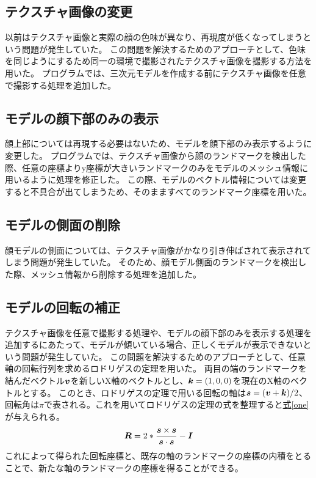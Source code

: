 \documentclass[]{jarticle}          %
\begin{document}
\subsection{テクスチャ画像の変更}
 以前はテクスチャ画像と実際の顔の色味が異なり、再現度が低くなってしまうという問題が発生していた。
この問題を解決するためのアプローチとして、色味を同じようにするため同一の環境で撮影されたテクスチャ画像を撮影する方法を用いた。
プログラムでは、三次元モデルを作成する前にテクスチャ画像を任意で撮影する処理を追加した。
\subsection{モデルの顔下部のみの表示}
 顔上部については再現する必要はないため、モデルを顔下部のみ表示するように変更した。
プログラムでは、テクスチャ画像から顔のランドマークを検出した際、任意の座標よりy座標が大きいランドマークのみをモデルのメッシュ情報に用いるように処理を修正した。
この際、モデルのベクトル情報については変更すると不具合が出てしまうため、そのまますべてのランドマーク座標を用いた。
\subsection{モデルの側面の削除}
 顔モデルの側面については、テクスチャ画像がかなり引き伸ばされて表示されてしまう問題が発生していた。
そのため、顔モデル側面のランドマークを検出した際、メッシュ情報から削除する処理を追加した。
\subsection{モデルの回転の補正}
テクスチャ画像を任意で撮影する処理や、モデルの顔下部のみを表示する処理を追加するにあたって、モデルが傾いている場合、正しくモデルが表示できないという問題が発生していた。
この問題を解決するためのアプローチとして、任意軸の回転行列を求めるロドリゲスの定理を用いた。
両目の端のランドマークを結んだベクトル$\mbox{\boldmath $v$}$を新しいX軸のベクトルとし、$\mbox{\boldmath $k$} = (1,0,0)$を現在のX軸のベクトルとする。
このとき、ロドリゲスの定理で用いる回転の軸は$\mbox{\boldmath $s$} = (\mbox{\boldmath $v$}+\mbox{\boldmath $k$})/2$、回転角は$\pi$で表される\cite{bib_1}。これを用いてロドリゲスの定理の式を整理すると\hyperref[one]{式\ref{one}}が与えられる。
\begin{equation}
  \mbox{\boldmath $R$} = 2*\frac{\mbox{\boldmath $s$}\times\mbox{\boldmath $s$}}{\mbox{\boldmath $s$}\cdot\mbox{\boldmath $s$}}-\mbox{\boldmath $I$}
\end{equation}
これによって得られた回転座標と、既存の軸のランドマークの座標の内積をとることで、新たな軸のランドマークの座標を得ることができる。
\end{document}
